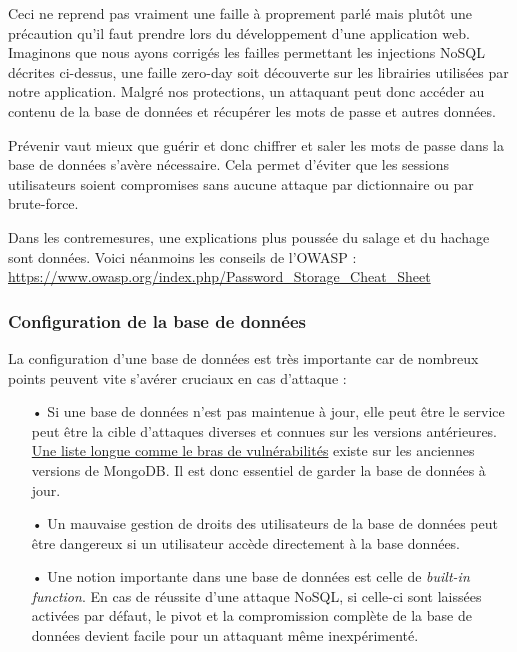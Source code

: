 Ceci ne reprend pas vraiment une faille à proprement parlé mais plutôt une précaution qu'il faut prendre lors du développement d'une application web. Imaginons que nous ayons corrigés les failles permettant les injections NoSQL décrites ci-dessus, une faille zero-day soit découverte sur
les librairies utilisées par notre application. Malgré nos protections, un attaquant peut donc accéder au contenu de la base de données et récupérer les mots de passe et autres données.

Prévenir vaut mieux que guérir et donc chiffrer et saler les mots de passe dans la base de données s'avère nécessaire. Cela permet d'éviter que les sessions utilisateurs soient compromises sans aucune attaque par dictionnaire ou par brute-force. 

Dans les contremesures, une explications plus poussée du salage et du hachage sont données. Voici néanmoins les conseils de l'OWASP : \url{https://www.owasp.org/index.php/Password_Storage_Cheat_Sheet}

\subsubsection{Configuration de la base de données}

La configuration d'une base de données est très importante car de nombreux points peuvent vite s'avérer cruciaux en cas d'attaque : 

\begin{itemize}
\item[•] Si une base de données n'est pas maintenue à jour, elle peut être le service peut être la cible d'attaques diverses et connues sur les versions antérieures. \href{https://www.cvedetails.com/vulnerability-list/vendor_id-12752/product_id-25450/Mongodb-Mongodb.html}{Une liste longue comme le bras de vulnérabilités} existe sur les anciennes versions de MongoDB. Il est donc essentiel de garder la base de données à jour.
\item[•] Un mauvaise gestion de droits des utilisateurs de la base de données peut être dangereux si un utilisateur accède directement à la base données.
\item[•] Une notion importante dans une base de données est celle de \emph{built-in function}. En cas de réussite d'une attaque NoSQL, si celle-ci sont laissées activées par défaut, le pivot et la compromission complète de la base de données devient facile pour un attaquant même inexpérimenté.
\end{itemize}

